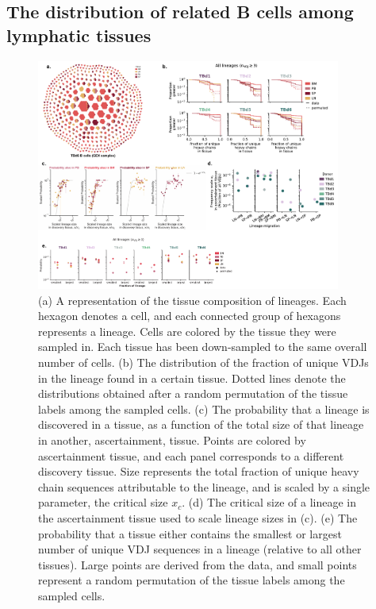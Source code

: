 \subsection{The distribution of related B cells among lymphatic tissues}
\begin{figure}
    \centering
    \includegraphics[width=10cm, keepaspectratio]{figs/Tabula_Bursa/Figure4_revised.pdf}
    \caption[Tissue distribution of phylogenetically related B cell, or lineages.]{(a) A representation of the tissue composition of lineages. Each hexagon denotes a cell, and each connected group of hexagons represents a lineage. Cells are colored by the tissue they were sampled in. Each tissue has been down-sampled to the same overall number of cells. (b) The distribution of the fraction of unique VDJs in the lineage found in a certain tissue. Dotted lines denote the distributions obtained after a random permutation of the tissue labels among the sampled cells.  (c) The probability that a lineage is discovered in a tissue, as a function of the total size of that lineage in another, ascertainment, tissue. Points are colored by ascertainment tissue, and each panel corresponds to a different discovery tissue. Size represents the total fraction of unique heavy chain sequences attributable to the lineage, and is scaled by a single parameter, the critical size $x_c$. (d) The critical size of a lineage in the ascertainment tissue used to scale lineage sizes in (c). (e) The probability that a tissue either contains the smallest or largest number of unique VDJ sequences in a lineage (relative to all other tissues). Large points are derived from the data, and small points represent a random permutation of the tissue labels among the sampled cells.}
    \label{fig:lineage-distribution}
\end{figure}


